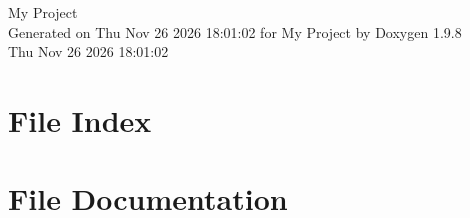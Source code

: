 \documentclass[twoside]{book}
\newcommand{\+}{\discretionary{\mbox{\scriptsize$\hookleftarrow$}}{}{}}
\newcommand{\clearemptydoublepage}{%
    \newpage{\pagestyle{empty}\cleardoublepage}%
  }
\begin{document}
  \raggedbottom
    \hypersetup{pageanchor=false,
                bookmarksnumbered=true,
                pdfencoding=unicode
               }
  \begin{titlepage}
  \vspace*{7cm}
  \begin{center}%
  {\Large My Project}\\
  \vspace*{1cm}
  {\large Generated on Thu Nov 26 2026 18\+:01\+:02 for My Project by Doxygen 1.9.8}\\
    \vspace*{0.5cm}
    {\small Thu Nov 26 2026 18:01:02}
  \end{center}
  \end{titlepage}
  \clearemptydoublepage
  \tableofcontents
  \clearemptydoublepage
  \hypersetup{pageanchor=true}

\chapter{File Index}

\chapter{File Documentation}


  \backmatter
  \newpage
  \clearemptydoublepage
  \printindex
\end{document}
